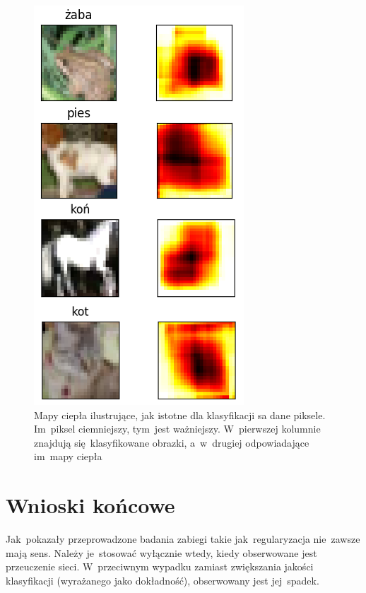 \begin{figure}[H]
	\centering
	\includegraphics[width=0.75\linewidth]{img/heatmap.png}
	\caption{Mapy ciepła ilustrujące, jak istotne dla klasyfikacji sa dane piksele. Im~piksel ciemniejszy, tym~jest
	ważniejszy. W~pierwszej kolumnie znajdują się~klasyfikowane obrazki, a~w~drugiej odpowiadające im~mapy ciepła}
	\label{rys:badanie-3}
\end{figure}

\section{Wnioski końcowe}
Jak~pokazały przeprowadzone badania zabiegi takie jak~regularyzacja nie~zawsze mają sens. Należy je~stosować wyłącznie
wtedy, kiedy obserwowane jest przeuczenie sieci. W~przeciwnym wypadku zamiast zwiększania jakości klasyfikacji
(wyrażanego jako dokładność), obserwowany jest jej~spadek.

